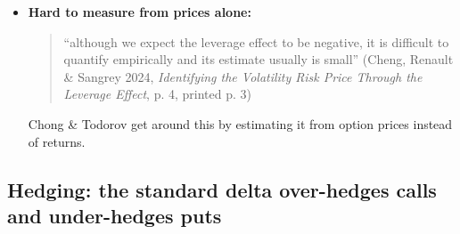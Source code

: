 \documentclass{article}
\begin{document}
\begin{itemize}
\item \textbf{Hard to measure from prices alone:}

\begin{quote}``although we expect the leverage effect to be negative, it is difficult to quantify empirically and its estimate usually is small'' (Cheng, Renault \& Sangrey 2024, \emph{Identifying the Volatility Risk Price Through the Leverage Effect}, p. 4, printed p. 3)\end{quote}

Chong \& Todorov get around this by estimating it from option prices instead of returns.

\end{itemize}

\subsection{Hedging: the standard delta over-hedges calls and under-hedges puts}
\end{document}
